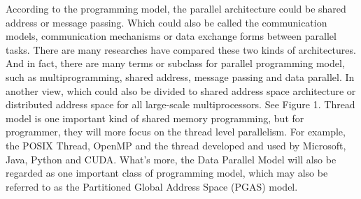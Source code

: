 \par According to the programming model, the parallel architecture could be shared address or message passing. Which could also be called the communication models, communication mechanisms or data exchange forms between parallel tasks. There are many researches have compared these two kinds of architectures\cite{hennessy2017computer}\cite{klaiber1994comparison}\cite{leblanc1992shared}. And in fact, there are many terms or subclass for parallel programming model, such as multiprogramming, shared address, message passing and data parallel. In another view, which could also be divided to shared address space architecture or distributed address space for all large-scale multiprocessors\cite{hennessy2017computer}. See Figure 1. Thread model is one important kind of shared memory programming, but for programmer, they will more focus on the thread level parallelism. For example, the POSIX Thread, OpenMP and the thread developed and used by Microsoft, Java, Python and CUDA. What's more, the Data Parallel Model will also be regarded as one important class of programming model, which may also be referred to as the Partitioned Global Address Space (PGAS) model.
 
